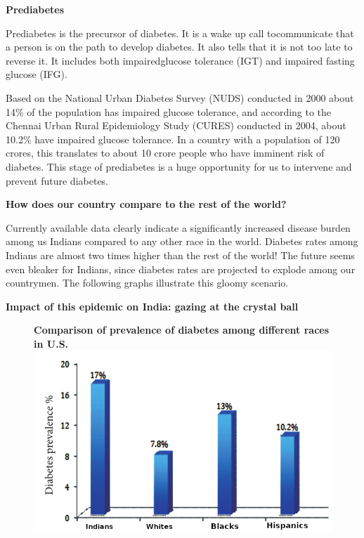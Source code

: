 \noindent\textbf{Prediabetes}


Prediabetes is the precursor of diabetes. It is a wake up call to\break communicate that a person is on the path to develop diabetes. It also tells that it is not too late to reverse it. It includes both impaired\break glucose tolerance (IGT) and impaired fasting glucose (IFG).

Based on the National Urban Diabetes Survey (NUDS) conducted in 2000 about 14\% of the population has impaired glucose tolerance, and according to the Chennai Urban Rural Epidemiology Study (CURES) conducted in 2004, about 10.2\% have impaired glucose tolerance. In a country with a population of 120 crores, this translates to about 10 crore people who have imminent risk of diabetes. This stage of prediabetes is a huge opportunity for us to intervene and prevent future diabetes.

\noindent\textbf{How does our country compare to the rest of the world?}

Currently available data clearly indicate a significantly increased disease burden among us Indians compared to any other race in the world. Diabetes rates among Indians are almost two times higher than the rest of the world! The future seems even bleaker for Indians, since diabetes rates are projected to explode among our countrymen. The following graphs illustrate this gloomy scenario.

\noindent\textbf{Impact of this epidemic on India: gazing at the crystal ball}

\begin{figure}[h]
\centering
{\small\textbf{Comparison of prevalence of diabetes among different races in U.S.}}\\
\includegraphics[scale=2.1]{images/031.jpg}
\end{figure}


